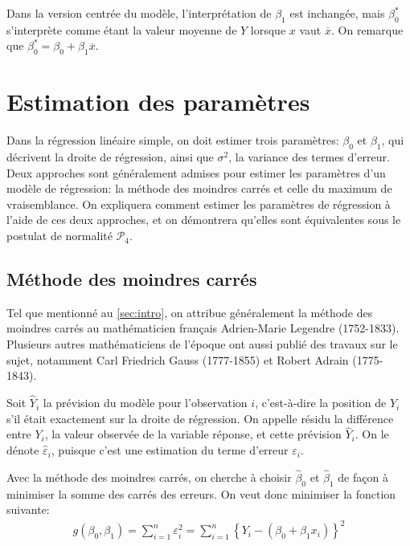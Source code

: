 Dans la version centrée du modèle, l'interprétation de $\beta_1$ est inchangée, mais $\beta_0^*$ s'interprète comme étant la valeur moyenne de $Y$ lorsque $x$ vaut $\overline{x}$. On remarque que $\beta_0^* = \beta_0 + \beta_1 \overline{x}$.


\section{Estimation des paramètres}
\label{sec:estimation}

Dans la régression linéaire simple, on doit estimer trois paramètres: $\beta_0$ et $\beta_1$, qui décrivent la droite de régression, ainsi que $\sigma^2$, la variance des termes d'erreur. Deux approches sont généralement admises pour estimer les paramètres d'un modèle de régression: la méthode des moindres carrés et celle du maximum de vraisemblance. On expliquera comment estimer les paramètres de régression à l'aide de ces deux approches, et on démontrera qu'elles sont équivalentes sous le postulat de normalité $\mathcal{P}_4$.

\subsection{Méthode des moindres carrés}

Tel que mentionné au \autoref{sec:intro}, on attribue généralement la méthode des moindres carrés au mathématicien français Adrien-Marie Legendre (1752-1833). Plusieurs autres mathématiciens de l'époque ont aussi publié des travaux sur le sujet, notamment Carl Friedrich Gauss (1777-1855) et Robert Adrain (1775-1843).

Soit $\hat{Y}_i$ la prévision du modèle pour l'observation $i$, c'est-à-dire la position de $Y_i$ s'il était exactement sur la droite de régression. On appelle résidu la différence entre $Y_i$, la valeur observée de la variable réponse, et cette prévision $\hat{Y}_i$. On le dénote $\hat{\varepsilon}_i$, puisque c'est une estimation du terme d'erreur $\varepsilon_i$.

Avec la méthode des moindres carrés, on cherche à choisir $\hat\beta_0$ et $\hat\beta_1$ de façon à minimiser la somme des carrés des erreurs. On veut donc minimiser la fonction suivante:
\begin{eqnarray}
g(\beta_0,\beta_1) =  \sum_{i=1}^n \varepsilon_i^2  =  \sum_{i=1}^n \left\{Y_i- (\beta_0+\beta_1 x_i)\right\}^2
    \label{eq:MoindresCarres}
\end{eqnarray}

